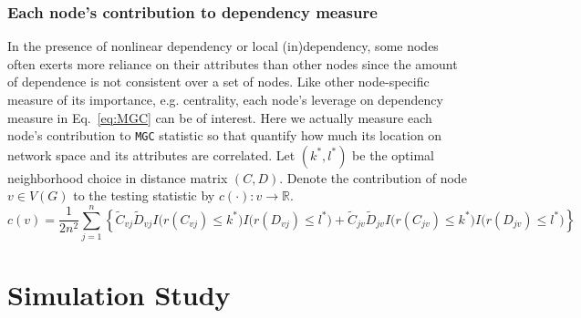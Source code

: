 \documentclass[12pt]{article}
\theoremstyle{definition}
\begin{document}
\subsubsection{Each node's contribution to dependency measure}

In the presence of nonlinear dependency or local (in)dependency, some nodes often exerts more reliance on their attributes than other nodes since the amount of dependence is not consistent over a set of nodes. Like other node-specific measure of its importance, e.g. centrality, each node's leverage on dependency measure in Eq.~\ref{eq:MGC} can be of interest. Here we actually measure each node's contribution to \texttt{MGC} statistic so that quantify how much its location on network space and its attributes are correlated.
Let $(k^{*}, l^{*})$ be the optimal neighborhood choice in distance matrix $(C, D)$.  Denote the contribution of node $v \in V(G)$ to the testing statistic by  $c(\cdot) : v \rightarrow \mathbb{R}$. 
\begin{equation}
\label{contribution}
c(v) = \frac{1}{2 n^2} \sum\limits_{j=1}^{n} \left\{     \tilde{C}_{v j} \tilde{D}_{v j} I \big(  r (C_{v j}) \leq k^{*}  \big) I \big( r (D_{ v j }) \leq l^{*} \big) + \tilde{C}_{j v} \tilde{D}_{j v} I \big(  r (C_{j v}) \leq k^{*}  \big) I \big( r (D_{j v}) \leq l^{*} \big) \right\} 
\end{equation}

\section{Simulation Study}
\label{sec:sim}
	
\end{document}
